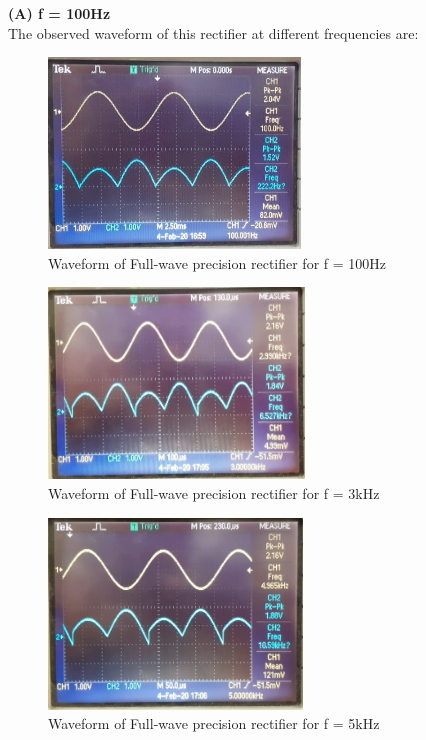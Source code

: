 \documentclass[12pt]{article}
\begin{document}
        \textbf{(A) f = 100Hz}\\
        
        The observed waveform of this rectifier at different frequencies are: 
        \begin{figure}[H]
            \centering
            \includegraphics[width = 0.5\linewidth, height = 2in]{reports/lab3/full_wave.jpeg}
            \caption{Waveform of Full-wave precision rectifier for f = 100Hz}
        \end{figure}
        \begin{figure}[H]
            \centering
            \includegraphics[width = 0.5\linewidth, height = 2in]{reports/lab3/full_wave-3k.jpeg}
            \caption{Waveform of Full-wave precision rectifier for f = 3kHz}
        \end{figure}
        \begin{figure}[H]
            \centering
            \includegraphics[width = 0.5\linewidth, height = 2in]{reports/lab3/full_wave-5k.jpeg}
            \caption{Waveform of Full-wave precision rectifier for f = 5kHz}
        \end{figure}
\end{document}
